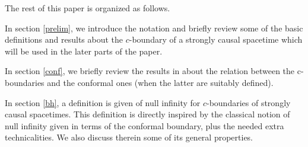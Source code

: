 The rest of this paper is organized as follows.

In section \ref{prelim}, we introduce the notation and briefly review some of the basic definitions and results about the $c$-boundary of a strongly causal spacetime which will be used in the later parts of the paper.



 In section \ref{conf}, we briefly review the results in \cite{Floresfinaldefinitioncausal2011} about the relation between the c-boundaries and the conformal ones (when the latter are suitably defined). %


 In section \ref{bh}, a definition is given of null infinity for $c$-boundaries of strongly causal spacetimes. This definition is directly inspired by the classical notion of null infinity given in terms of the conformal boundary, plus the needed extra technicalities. We also discuss therein some of its general properties.

